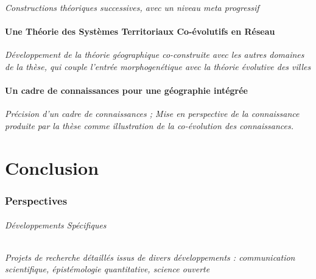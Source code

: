 
\textit{Constructions théoriques successives, avec un niveau meta progressif}

\subsection{Une Théorie des Systèmes Territoriaux Co-évolutifs en Réseau}

\textit{Développement de la théorie géographique co-construite avec les autres domaines de la thèse, qui couple l'entrée morphogenétique avec la théorie évolutive des villes}





\subsection{Un cadre de connaissances pour une géographie intégrée}

\textit{Précision d'un cadre de connaissances ; Mise en perspective de la connaissance produite par la thèse comme illustration de la co-évolution des connaissances.}



\part*{Conclusion}


\section*{Perspectives}

\paragraph{Développements Spécifiques}


\textit{Projets de recherche détaillés issus de divers développements : communication scientifique, épistémologie quantitative, science ouverte}

